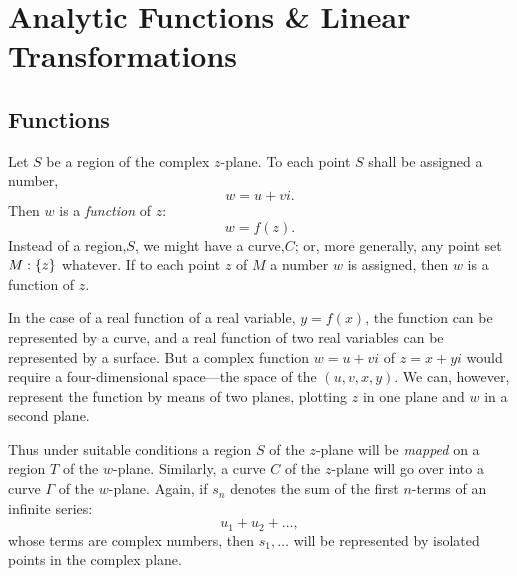 \documentclass[twosided]{memoir}
\begin{document}
\chapter{Analytic Functions \& Linear Transformations}
\section{Functions}
Let $S$ be a region of the complex $z$-plane. To each point $S$ shall be assigned a number,
\[
w=u+vi
.\] Then $w$ is a \emph{function} of $z$:
\[
	w=f(z)
.\] Instead of a region,$S$, we might have a curve,$C$; or, more generally, any point set $M:\cbr*{z} $ whatever. If to each point $z$ of $M$ a number $w$ is assigned, then $w$ is a function of $z$.

In the case of a real function of a real variable, $y=f(x)$, the function can be represented by a curve, and a real function of two real variables can be represented by a surface. But a complex function $w=u+vi$ of $z=x+yi$ would require a four-dimensional space---the space of the $(u,v,x,y)$. We can, however, represent the function by means of two planes, plotting $z$ in one plane and $w$ in a second plane.

\begin{figure}[htbp]
\centering
{}
\end{figure}

Thus under suitable conditions a region $S$ of the $z$-plane will be \emph{mapped} on a region $T$ of the $w$-plane. Similarly, a curve $C$ of the $z$-plane will go over into a curve $\Gamma$ of the $w$-plane. Again, if $s_n$ denotes the sum of the first $n$-terms of an infinite series:
\[
u_1+u_2+\dots 
,\] whose terms are complex numbers, then $s_1, \dots $ will be represented by isolated points in the complex plane. 
\end{document}
